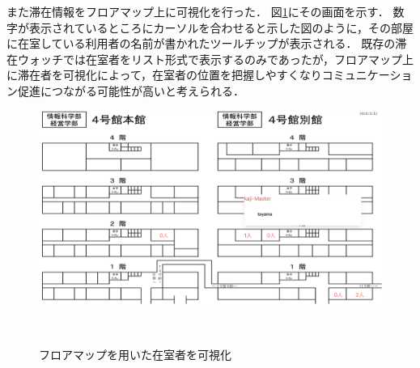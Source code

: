 また滞在情報をフロアマップ上に可視化を行った．
図\ref{fig:floor}にその画面を示す．
数字が表示されているところにカーソルを合わせると示した図のように，その部屋に在室している利用者の名前が書かれたツールチップが表示される．
既存の滞在ウォッチでは在室者をリスト形式で表示するのみであったが，フロアマップ上に滞在者を可視化によって，在室者の位置を把握しやすくなりコミュニケーション促進につながる可能性が高いと考えられる．


\begin{figure}[tbh]
  \centering
  \includegraphics[width=15cm]{image/floorMap.jpg}
  \caption{フロアマップを用いた在室者を可視化}　\label{fig:floor}
\end{figure}




















